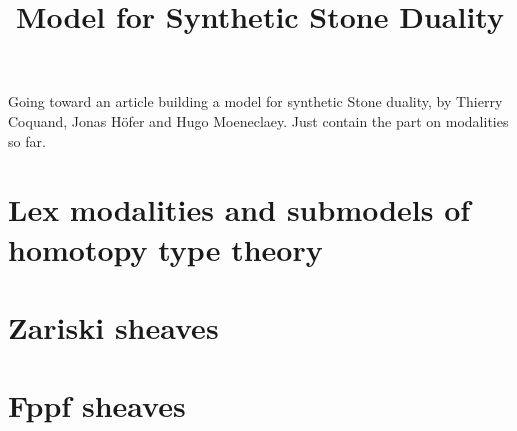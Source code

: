\documentclass{../util/zariski}
\title{Model for Synthetic Stone Duality}
\begin{document}
\maketitle

Going toward an article building a model for synthetic Stone duality, by Thierry Coquand, Jonas Höfer and Hugo Moeneclaey. Just contain the part on modalities so far.

\tableofcontents

\section{Lex modalities and submodels of homotopy type theory}


\section{Zariski sheaves}


\section{Fppf sheaves}


%

%

%

%



\printindex

\printbibliography
\end{document}
